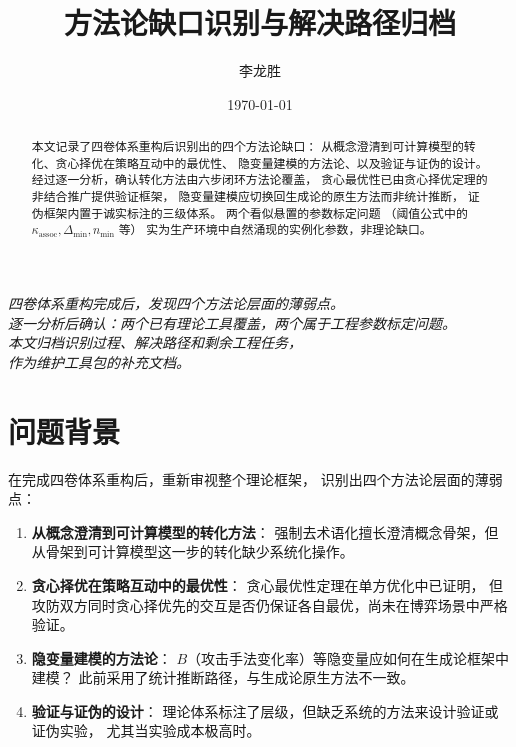 \documentclass[11pt,a4paper]{article}
\title{方法论缺口识别与解决路径归档}
\author{李龙胜}
\date{\today}
\begin{document}
\maketitle

\begin{center}
\textit{
四卷体系重构完成后，发现四个方法论层面的薄弱点。\\
逐一分析后确认：两个已有理论工具覆盖，两个属于工程参数标定问题。\\
本文归档识别过程、解决路径和剩余工程任务，\\
作为维护工具包的补充文档。
}
\end{center}

\vspace{5mm}

\begin{abstract}
本文记录了四卷体系重构后识别出的四个方法论缺口：
从概念澄清到可计算模型的转化、贪心择优在策略互动中的最优性、
隐变量建模的方法论、以及验证与证伪的设计。
经过逐一分析，确认转化方法由六步闭环方法论覆盖，
贪心最优性已由贪心择优定理的非结合推广提供验证框架，
隐变量建模应切换回生成论的原生方法而非统计推断，
证伪框架内置于诚实标注的三级体系。
两个看似悬置的参数标定问题
（阈值公式中的 $\kappa_{\text{assoc}}, \Delta_{\min}, n_{\min}$ 等）
实为生产环境中自然涌现的实例化参数，非理论缺口。
\end{abstract}

\tableofcontents

\section{问题背景}

在完成四卷体系重构后，重新审视整个理论框架，
识别出四个方法论层面的薄弱点：
\begin{enumerate}
    \item \textbf{从概念澄清到可计算模型的转化方法}：
          强制去术语化擅长澄清概念骨架，但从骨架到可计算模型这一步的转化缺少系统化操作。
    \item \textbf{贪心择优在策略互动中的最优性}：
          贪心最优性定理在单方优化中已证明，
          但攻防双方同时贪心择优先的交互是否仍保证各自最优，尚未在博弈场景中严格验证。
    \item \textbf{隐变量建模的方法论}：
          $B$（攻击手法变化率）等隐变量应如何在生成论框架中建模？
          此前采用了统计推断路径，与生成论原生方法不一致。
    \item \textbf{验证与证伪的设计}：
          理论体系标注了层级，但缺乏系统的方法来设计验证或证伪实验，
          尤其当实验成本极高时。
\end{enumerate}
\end{document}
